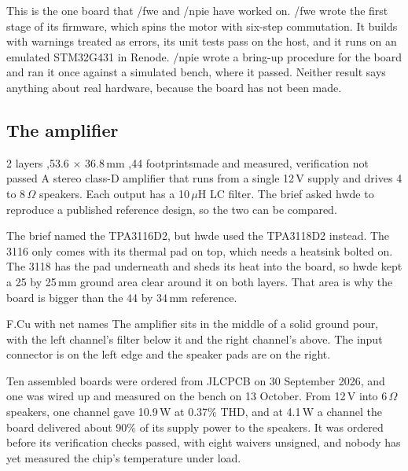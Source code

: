 This is the one board that /fwe and /npie have worked on. /fwe wrote the first
stage of its firmware, which spins the motor with six-step commutation. It
builds with warnings treated as errors, its unit tests pass on the host, and
it runs on an emulated STM32G431 in Renode. /npie wrote a bring-up procedure
for the board and ran it once against a simulated bench, where it passed.
Neither result says anything about real hardware, because the board has not
been made.

\newpage

\subsection{The amplifier}

%
{2 layers \sep 53.6 $\times$ 36.8\,mm \sep 44 footprints}{made and measured, verification not passed}%
{A stereo class-D amplifier that runs from a single 12\,V supply and drives 4
to 8\,$\Omega$ speakers. Each output has a 10\,$\mu$H LC filter. The brief
asked hwde to reproduce a published reference design, so the two can be
compared.}

The brief named the TPA3116D2, but hwde used the TPA3118D2 instead. The 3116
only comes with its thermal pad on top, which needs a heatsink bolted on. The
3118 has the pad underneath and sheds its heat into the board, so hwde kept a
25 by 25\,mm ground area clear around it on both layers. That area is why the
board is bigger than the 44 by 34\,mm reference.

%
{F.Cu with net names}{}%
{The amplifier sits in the middle of a solid ground pour, with the left
channel's filter below it and the right channel's above. The input connector
is on the left edge and the speaker pads are on the right.}

Ten assembled boards were ordered from JLCPCB on 30 September 2026, and one
was wired up and measured on the bench on 13 October. From 12\,V into
6\,$\Omega$ speakers, one channel gave 10.9\,W at 0.37\% THD, and at 4.1\,W a
channel the board delivered about 90\% of its supply power to the speakers. It
was ordered before its verification checks passed, with eight waivers
unsigned, and nobody has yet measured the chip's temperature under load.

